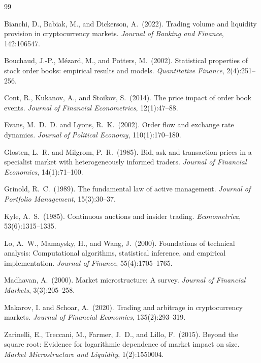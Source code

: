 \documentclass[12pt,a4paper]{article}
\theoremstyle{definition}
\theoremstyle{remark}
\begin{document}
\newpage

\begin{thebibliography}{99}

Bianchi, D., Babiak, M., and Dickerson, A.\ (2022).
\newblock Trading volume and liquidity provision in cryptocurrency markets.
\newblock \emph{Journal of Banking and Finance}, 142:106547.

Bouchaud, J.-P., M\'ezard, M., and Potters, M.\ (2002).
\newblock Statistical properties of stock order books: empirical results
  and models.
\newblock \emph{Quantitative Finance}, 2(4):251--256.

Cont, R., Kukanov, A., and Stoikov, S.\ (2014).
\newblock The price impact of order book events.
\newblock \emph{Journal of Financial Econometrics}, 12(1):47--88.

Evans, M.~D.~D. and Lyons, R.~K.\ (2002).
\newblock Order flow and exchange rate dynamics.
\newblock \emph{Journal of Political Economy}, 110(1):170--180.

Glosten, L.~R. and Milgrom, P.~R.\ (1985).
\newblock Bid, ask and transaction prices in a specialist market with
  heterogeneously informed traders.
\newblock \emph{Journal of Financial Economics}, 14(1):71--100.

Grinold, R.~C.\ (1989).
\newblock The fundamental law of active management.
\newblock \emph{Journal of Portfolio Management}, 15(3):30--37.

Kyle, A.~S.\ (1985).
\newblock Continuous auctions and insider trading.
\newblock \emph{Econometrica}, 53(6):1315--1335.

Lo, A.~W., Mamaysky, H., and Wang, J.\ (2000).
\newblock Foundations of technical analysis: Computational algorithms,
  statistical inference, and empirical implementation.
\newblock \emph{Journal of Finance}, 55(4):1705--1765.

Madhavan, A.\ (2000).
\newblock Market microstructure: A survey.
\newblock \emph{Journal of Financial Markets}, 3(3):205--258.

Makarov, I. and Schoar, A.\ (2020).
\newblock Trading and arbitrage in cryptocurrency markets.
\newblock \emph{Journal of Financial Economics}, 135(2):293--319.

Zarinelli, E., Treccani, M., Farmer, J.~D., and Lillo, F.\ (2015).
\newblock Beyond the square root: Evidence for logarithmic dependence of
  market impact on size.
\newblock \emph{Market Microstructure and Liquidity}, 1(2):1550004.

\end{thebibliography}
\end{document}
